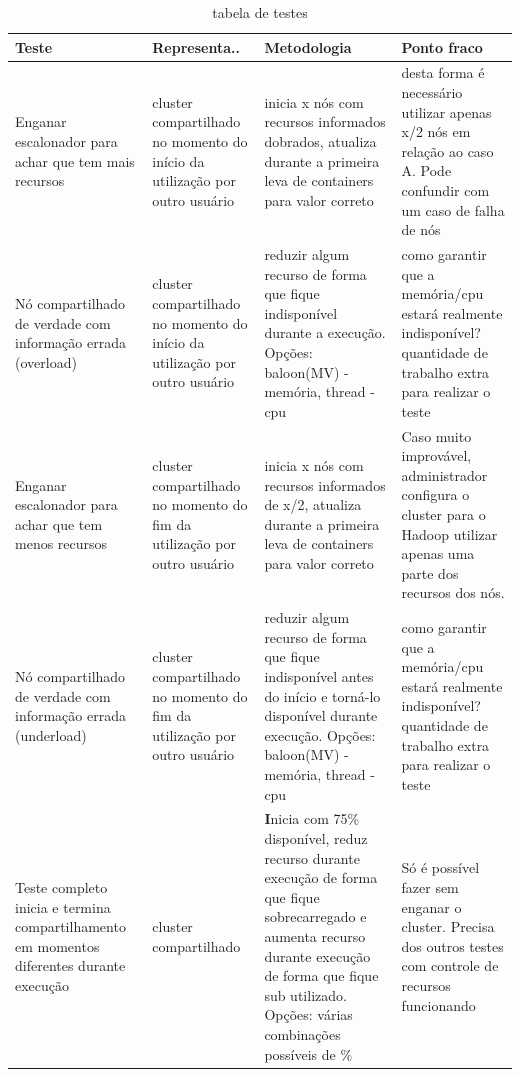 \begin{table}[!h]
	\centering
	\begin{tabular}{|p{2.5cm}|p{3.5cm}|p{4.5cm}|p{4.0cm}|}
		\hline
		Teste & Representa.. & Metodologia & Ponto fraco\\
		\hline
		Enganar escalonador para achar que tem mais recursos & cluster compartilhado no momento do início da utilização por outro usuário & inicia x nós com recursos informados dobrados, atualiza durante a primeira leva de containers para valor correto & desta forma é necessário utilizar apenas x/2 nós em relação ao caso A. Pode confundir com um caso de falha de nós\\
		\hline
		Nó compartilhado de verdade com informação errada (overload)& cluster compartilhado no momento do início da utilização por outro usuário & reduzir algum recurso de forma que fique indisponível durante a execução. Opções: baloon(MV) - memória, thread - cpu & como garantir que a memória/cpu estará realmente indisponível? quantidade de trabalho extra para realizar o teste\\
		\hline
		Enganar escalonador para achar que tem menos recursos & cluster compartilhado no momento do fim da utilização por outro usuário & inicia x nós com recursos informados de x/2, atualiza durante a primeira leva de containers para valor correto & Caso muito improvável, administrador configura o cluster para o Hadoop utilizar apenas uma parte dos recursos dos nós.\\
		\hline
		Nó compartilhado de verdade com informação errada (underload)& cluster compartilhado no momento do fim da utilização por outro usuário & reduzir algum recurso de forma que fique indisponível antes do início e torná-lo disponível durante execução. Opções: baloon(MV) - memória, thread - cpu & como garantir que a memória/cpu estará realmente indisponível? quantidade de trabalho extra para realizar o teste\\
		\hline
		Teste completo inicia e termina compartilhamento em momentos diferentes durante execução & cluster compartilhado & \textbf Inicia com 75\% disponível, reduz recurso durante execução de forma que fique sobrecarregado e aumenta recurso durante execução de forma que fique sub utilizado. Opções: {várias combinações} possíveis de \% & Só é possível fazer sem enganar o cluster. Precisa dos outros testes com controle de recursos funcionando\\
		\hline
	\end{tabular}
	\caption{tabela de testes}
	\label{tab:memory allocation2}
\end{table}